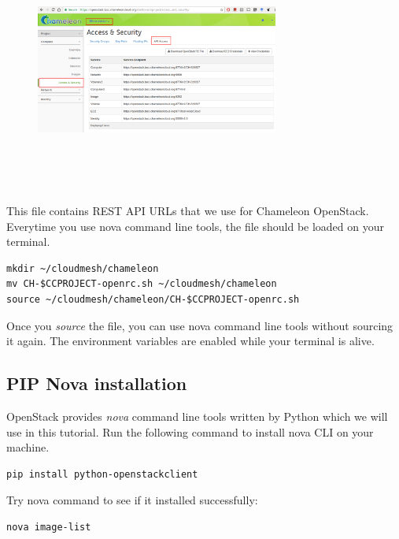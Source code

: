   \begin{figure}[!htbp]
    \includegraphics[width=8cm,height=8cm]{section/cloud/chameleon/images/openstack-chameleon-openrc.png}
    \centering
  \end{figure}

This file contains REST API URLs that we use for Chameleon
OpenStack.  Everytime you use nova command line tools, the file
should be loaded on your terminal.






\begin{lstlisting}
mkdir ~/cloudmesh/chameleon
mv CH-$CCPROJECT-openrc.sh ~/cloudmesh/chameleon
source ~/cloudmesh/chameleon/CH-$CCPROJECT-openrc.sh
\end{lstlisting}

Once you \textit{source} the file, you can use nova command line tools
without sourcing it again.  The environment variables are enabled
while your terminal is alive.

\subsection{PIP Nova installation}

OpenStack provides \textit{nova} command line tools written by Python
which we will use in this tutorial. Run the following command to
install nova CLI on your machine.

\begin{lstlisting}
pip install python-openstackclient
\end{lstlisting}

Try nova command to see if it installed successfully:

\begin{lstlisting}
nova image-list
\end{lstlisting}

